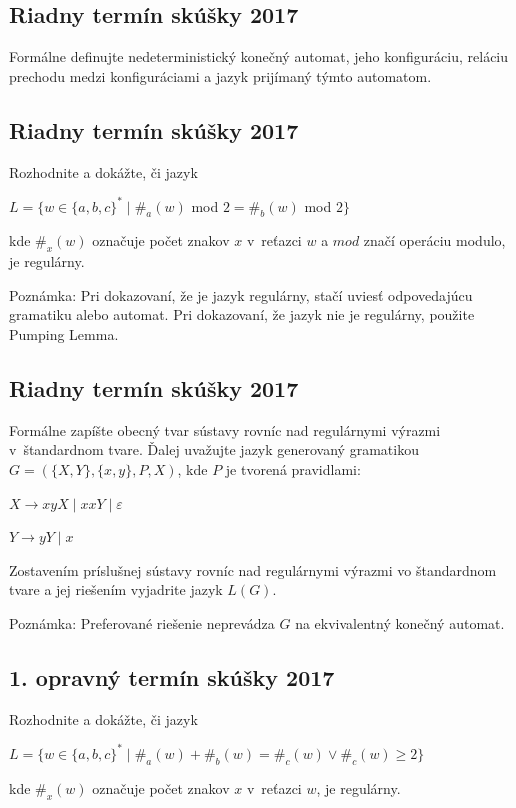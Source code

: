 \documentclass[11pt,a4paper]{article}
\begin{document}
		\subsection{Riadny termín skúšky 2017}

		Formálne definujte nedeterministický konečný automat, jeho konfiguráciu, reláciu prechodu medzi konfiguráciami a jazyk prijímaný týmto automatom.

		\subsection{Riadny termín skúšky 2017}

		Rozhodnite a dokážte, či jazyk

		$L = \{w \in \{a,b,c\}^* \mid \#_a(w)$ mod $2 = \#_b(w)$ mod $2\}$

		kde $\#_x(w)$ označuje počet znakov $x$ v~reťazci $w$ a $mod$ značí operáciu modulo, je regulárny.

		Poznámka: Pri dokazovaní, že je jazyk regulárny, stačí uviesť odpovedajúcu gramatiku alebo automat. Pri dokazovaní, že jazyk nie je regulárny, použite Pumping Lemma.

		\subsection{Riadny termín skúšky 2017}

		Formálne zapíšte obecný tvar sústavy rovníc nad regulárnymi výrazmi v~štandardnom tvare. Ďalej uvažujte jazyk generovaný gramatikou $G = (\{X,Y\}, \{x,y\}, P, X)$, kde $P$ je tvorená pravidlami:

		$X \rightarrow xyX \mid xxY \mid \varepsilon$

		$Y \rightarrow yY \mid x$

		Zostavením príslušnej sústavy rovníc nad regulárnymi výrazmi vo štandardnom tvare a jej riešením vyjadrite jazyk $L(G)$.

		Poznámka: Preferované riešenie neprevádza $G$ na ekvivalentný konečný automat.

		\subsection{1. opravný termín skúšky 2017}

		Rozhodnite a dokážte, či jazyk

		$L = \{w \in \{a,b,c\}^* \mid \#_a(w) + \#_b(w) =  \#_c(w) \lor \#_c(w) \geq 2\}$

		kde $\#_x(w)$ označuje počet znakov $x$ v~reťazci $w$, je regulárny.
\end{document}
